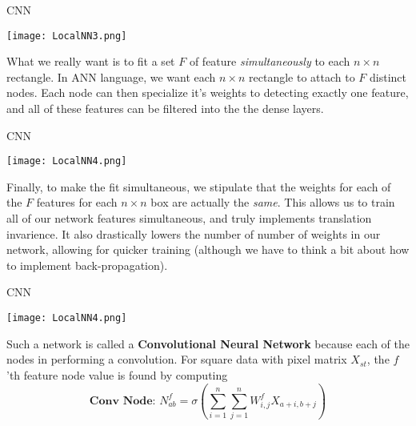 \documentclass[10pt, table, dvipsnames,xcdraw, handout]{beamer}
\begin{document}
\begin{frame}[fragile]{CNN}
  \begin{minipage}[t][0.5\textheight][t]{\textwidth}\centering
\begin{center}
\texttt{[image: LocalNN3.png]}
\end{center}
  \end{minipage}
  \vfill
\begin{minipage}[t][0.5\textheight][t]{\textwidth}
What we really want is to fit a set $F$ of feature \emph{simultaneously} to each $n\times n$ rectangle. In ANN language, we want each $n\times n$ rectangle to attach to $F$ distinct nodes. Each node can then specialize it's weights to detecting exactly one feature, and all of these features can be filtered into the the dense layers. 
\end{minipage}
\end{frame}



\begin{frame}[fragile]{CNN}
  \begin{minipage}[t][0.5\textheight][t]{\textwidth}\centering
\begin{center}
\texttt{[image: LocalNN4.png]}
\end{center}
  \end{minipage}
  \vfill
\begin{minipage}[t][0.5\textheight][t]{\textwidth}
Finally, to make the fit simultaneous, we stipulate that the weights for each of the $F$ features for each $n\times n$ box are actually the \emph{same}. This allows us to train all of our network features simultaneous, and truly implements translation invarience. It also drastically lowers the number of number of weights in our network, allowing for quicker training (although we have to think a bit about how to implement back-propagation).
\end{minipage}
\end{frame}




\begin{frame}[fragile]{CNN}
  \begin{minipage}[t][0.5\textheight][t]{\textwidth}\centering
\begin{center}
\texttt{[image: LocalNN4.png]}
\end{center}
  \end{minipage}
  \vfill
\begin{minipage}[t][0.5\textheight][t]{\textwidth}
Such a network is called a \textbf{Convolutional Neural Network} because each of the nodes in performing a convolution. For square data with pixel matrix $X_{st}$, the $f$'th feature node value is found by computing
$$
\textbf{Conv Node: } N_{ab}^f = \sigma\left(\sum_{i = 1}^n\sum_{j=1}^n  W_{i,j}^fX_{a+i, b+j} \right)
$$
\end{minipage}
\end{frame}
\end{document}
